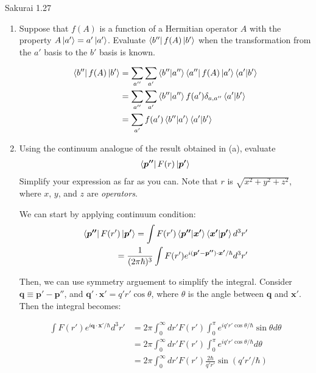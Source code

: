 \documentclass{article}
\begin{document}
\newpage
\begin{section}{Sakurai 1.27}
\begin{enumerate}
	\item Suppose that $f(A)$ is a function of a Hermitian operator $A$ with the property $A\ket{a'} = a'\ket{a'}$. Evaluate $\bra{b''}{f(A)}\ket{b'}$ when the transformation from the $a'$ basis to the $b'$ basis is known.

	\begin{tcolorbox}
		\begin{align*}
			\bra{b''}{f(A)}\ket{b'}
			 & = \sum_{a''}\sum_{a'} \bra{b''}\ket{a''} \bra{a''}f(A)\ket{a'} \bra{a'}\ket{b'} \\
			 & = \sum_{a''}\sum_{a'} \bra{b''}\ket{a''} f(a')\delta_{a,a''} \bra{a'}\ket{b'}   \\
			 & = \sum_{a'} f(a') \bra{b''}\ket{a'} \bra{a'}\ket{b'}                            \\
		\end{align*}
	\end{tcolorbox}

	\item Using the continuum analogue of the result obtained in (a), evaluate
	\begin{align*}
		\bra{\boldsymbol{p''}}{F(r)}\ket{\boldsymbol{p'}}
	\end{align*}
	Simplify your expression as far as you can. Note that $r$ is $\sqrt{x^2 + y^2 + z^2}$, where $x$, $y$, and $z$ are {\it operators}.

	\begin{tcolorbox}
		We can start by applying continuum condition:
		\begin{align*}
			\bra{\boldsymbol{p''}}{F(r')}\ket{\boldsymbol{p'}}
			= \int F(r') \bra{\boldsymbol{p''}}\ket{\boldsymbol{x'}} \bra{\boldsymbol{x'}}\ket{\boldsymbol{p'}} d^3r'         \\
			= \frac{1}{(2 \pi \hbar)^3} \int F(r') e^{i (\boldsymbol{p'}-\boldsymbol{p''}) \cdot \boldsymbol{x'}/\hbar} d^3r' \\
		\end{align*}

		Then, we can use symmetry arguement to simplify the integral. Consider $\boldsymbol q \equiv \boldsymbol{p'} - \boldsymbol{p''}$, and $\boldsymbol{q'} \cdot \boldsymbol{x'} = q'r' \cos \theta$, where $\theta$ is the angle between $\boldsymbol{q}$ and $\boldsymbol{x'}$. Then the integral becomes:

		\begin{align*}
			\int F(r') e^{i \boldsymbol{q} \cdot \boldsymbol{x'}/\hbar} d^3r'
			 & =  2\pi \int_0^\infty dr'F(r') \int_0^\pi e^{i q'r' \cos \theta /\hbar } \sin \theta d \theta \\
			 & = 2\pi \int_0^\infty dr'F(r') \int_0^\pi e^{i q'r' \cos \theta /\hbar } d \theta              \\
			 & = 2\pi \int_0^\infty dr'F(r') \frac{2\hbar}{q'r'} \sin{(q'r'/\hbar)}
		\end{align*}


\end{tcolorbox}
\end{enumerate}
\end{section}
\end{document}
